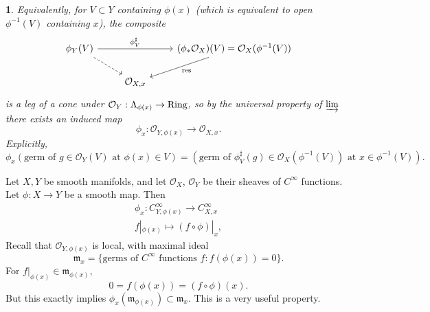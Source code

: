 \documentclass[12pt]{article}
\newtheorem{para}[theorem]{}
\begin{document}
\begin{para}
	Equivalently, for $V\subset Y$ containing $\phi(x)$ (which is equivalent to open $\phi^{-1}(V)$ containing $x$), the composite 
	\begin{equation*}
\begin{tikzcd}
\phi_Y(V) \arrow[rr, "\phi^\sharp_V"] \arrow[rd, dashed] &                     & (\phi_\ast\mathcal{O}_X)(V)=\mathcal{O}_X(\phi^{-1}(V)) \arrow[ld, "\text{res}"] \\
                                                         & {\mathcal{O}_{X,x}} &                                                                                 
\end{tikzcd}
	\end{equation*}
	is a leg of a cone under $\mathcal{O}_Y:\Lambda_{\phi(x)}\to\text{Ring}$, so by the universal property of $\varinjlim$ there exists an induced map 
	\begin{equation*}
		\phi_x:\mathcal{O}_{Y,\phi(x)}\to\mathcal{O}_{X,x}.
	\end{equation*}
	Explicitly, 
	\begin{equation*}
		\phi_x(\text{germ of }g\in\mathcal{O}_Y(V)\text{ at }\phi(x)\in V)
		= (\text{germ of }\phi^\sharp_V(g)\in\mathcal{O}_X(\phi^{-1}(V))\text{ at }x\in\phi^{-1}(V)).
	\end{equation*}
\end{para}

\begin{example}
	Let $X,Y$ be smooth manifolds, and let $\mathcal{O}_X$, $\mathcal{O}_Y$ be their sheaves of $C^\infty$ functions. Let $\phi:X\to Y$ be a smooth map. Then 
	\begin{gather*}
		\phi_x:C^\infty_{Y,\phi(x)}\to C^\infty_{X,x} \\
		f|_{\phi(x)} \mapsto (f\circ\phi)|_x,
	\end{gather*}
	Recall that $\mathcal{O}_{Y,\phi(x)}$ is local, with maximal ideal 
	\begin{equation*}
		\mathfrak{m}_x = \{\text{germs of }C^\infty\text{ functions }f : f(\phi(x))=0\}.
	\end{equation*}
	For $f|_{\phi(x)}\in\mathfrak{m}_{\phi(x)}$, 
	\begin{equation*}
		0 = f(\phi(x)) = (f\circ\phi)(x).
	\end{equation*}
	But this exactly implies $\phi_x(\mathfrak{m}_{\phi(x)})\subset\mathfrak{m}_x$. This is a very useful property.
\end{example}
\end{document}
